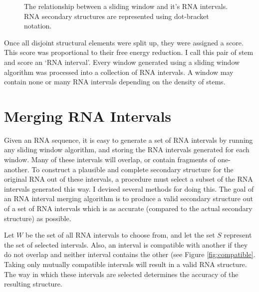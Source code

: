 \documentclass{cshonours}
\begin{document}
\begin{figure}
\begin{center}
\end{center}
\caption{The relationship between a sliding window and it's RNA intervals. RNA secondary structures are represented using dot-bracket notation.}
\label{fig:rnainterval}
\end{figure}

Once all disjoint structural elements were split up, they were assigned a score. This score was proportional to their free energy reduction. I call this pair of stem and score an `RNA interval'. Every window generated using a sliding window algorithm was processed into a collection of RNA intervals. A window may contain none or many RNA intervals depending on the density of stems.





\section{Merging RNA Intervals}

Given an RNA sequence, it is easy to generate a set of RNA intervals by running any sliding window algorithm, and storing the RNA intervals generated for each window. Many of these intervals will overlap, or contain fragments of one-another. To construct a plausible and complete secondary structure for the original RNA out of these intervals, a procedure must select a subset of the RNA intervals generated this way. I devised several methods for doing this. The goal of an RNA interval merging algorithm is to produce a valid secondary structure out of a set of RNA intervals which is as accurate (compared to the actual secondary structure) as possible.


Let $W$ be the set of all RNA intervals to choose from, and let the set $S$ represent the set of selected intervals. Also, an interval is compatible with another if they do not overlap and neither interval contains the other (see Figure \ref{fig:compatible}. Taking only mutually compatible intervals will result in a valid RNA  structure. The way in which these intervals are selected determines the accuracy of the resulting structure.
\end{document}
